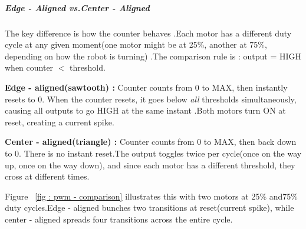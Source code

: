 \subparagraph{Edge - Aligned vs.Center -
               Aligned} The key difference is how the counter behaves
            .Each motor has a different duty cycle at any given
            moment(one motor might be at 25\%, another at 75\%,
                   depending on how the robot is turning)
            .The comparison rule is
    : output = HIGH when counter $ < $ threshold.

\textbf{Edge - aligned(sawtooth) : } Counter counts from 0 to MAX,
      then instantly resets to 0. When the counter resets,
      it goes below \textit{all} thresholds simultaneously,
      causing all outputs to go HIGH at the same instant
          .Both motors turn ON at reset,
      creating a current spike.

\textbf{Center - aligned(triangle) : } Counter counts from 0 to MAX,
      then back down to
      0. There is no instant reset.The output toggles twice per
      cycle(once on the way up, once on the way down),
      and since each motor has a different threshold,
      they cross at different times.

              Figure ~\ref{fig : pwm - comparison} illustrates
              this with two motors at 25\%
              and75\% duty cycles.Edge
          - aligned bunches two transitions at reset(current spike),
      while center - aligned spreads four transitions across the entire cycle.

